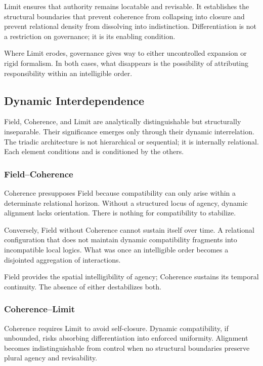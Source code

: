 \documentclass[12pt]{article}
\begin{document}
Limit ensures that authority remains locatable and revisable. It establishes the structural boundaries that prevent coherence from collapsing into closure and prevent relational density from dissolving into indistinction. Differentiation is not a restriction on governance; it is its enabling condition.

Where Limit erodes, governance gives way to either uncontrolled expansion or rigid formalism. In both cases, what disappears is the possibility of attributing responsibility within an intelligible order.

\subsection{Dynamic Interdependence}


Field, Coherence, and Limit are analytically distinguishable but structurally inseparable. Their significance emerges only through their dynamic interrelation. The triadic architecture is not hierarchical or sequential; it is internally relational. Each element conditions and is conditioned by the others.

\subsubsection{Field–Coherence}


Coherence presupposes Field because compatibility can only arise within a determinate relational horizon. Without a structured locus of agency, dynamic alignment lacks orientation. There is nothing for compatibility to stabilize.

Conversely, Field without Coherence cannot sustain itself over time. A relational configuration that does not maintain dynamic compatibility fragments into incompatible local logics. What was once an intelligible order becomes a disjointed aggregation of interactions.

Field provides the spatial intelligibility of agency; Coherence sustains its temporal continuity. The absence of either destabilizes both.

\subsubsection{Coherence–Limit}


Coherence requires Limit to avoid self-closure. Dynamic compatibility, if unbounded, risks absorbing differentiation into enforced uniformity. Alignment becomes indistinguishable from control when no structural boundaries preserve plural agency and revisability.
\end{document}
